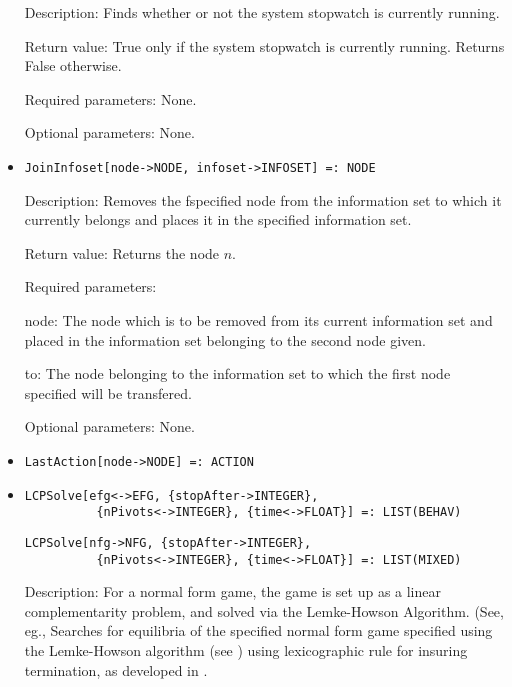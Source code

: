 \begin{itemize}
\bd
\item
[Description:] Finds whether or not the system stopwatch is currently
running.
\item
[Return value:] True only if the system stopwatch is currently
running.  Returns False otherwise.
\item
[Required parameters:] None.
\item
[Optional parameters:] None.
\ed


\item
\protect \large \begin{verbatim}
JoinInfoset[node->NODE, infoset->INFOSET] =: NODE
\end{verbatim}\normalsize

\bd
\item
[Description:] Removes the fspecified node from the information set to
which it currently belongs and places it in the specified information
set.
\item
[Return value:] Returns the node $n$.
\item
[Required parameters:]\hfil\null
	  
\bd
\item
[node:] The node which is to be removed from its current information set
and placed in the information set belonging to the second node given.
\item
[to:] The node belonging to the information set to which the first
node specified will be transfered.
\ed

\item
[Optional parameters:] None.
\ed



\item
\protect \large \begin{verbatim} 
LastAction[node->NODE] =: ACTION
\end{verbatim}\normalsize

\item
\protect \large \begin{verbatim}
LCPSolve[efg<->EFG, {stopAfter->INTEGER},
          {nPivots<->INTEGER}, {time<->FLOAT}] =: LIST(BEHAV)
\end{verbatim}\normalsize

\protect \large \begin{verbatim}
LCPSolve[nfg->NFG, {stopAfter->INTEGER},
          {nPivots<->INTEGER}, {time<->FLOAT}] =: LIST(MIXED)
\end{verbatim}\normalsize
\bd
\item
[Description:] For a normal form game, the game is set up as a linear
complementarity problem, and solved via the Lemke-Howson Algorithm.
(See, eg., Searches for equilibria of the specified normal form game
specified using the Lemke-Howson algorithm (see
\cite[1964]{LemHow:64}) using lexicographic rule for insuring
termination, as developed in \cite[1971]{Eav:71}.


\end{itemize}

